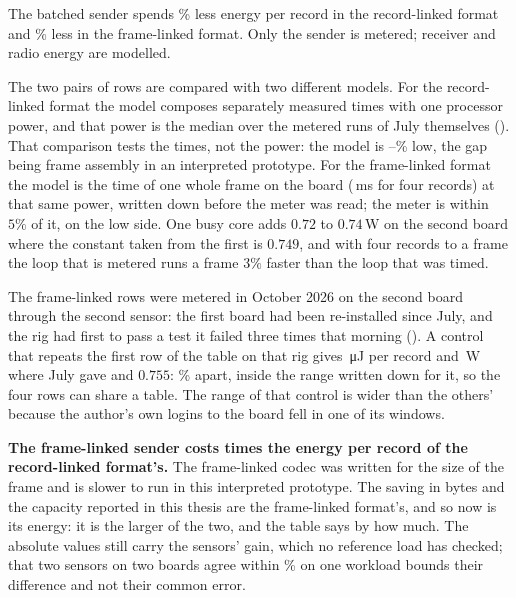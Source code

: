 The batched sender spends \enSavePct\% less energy per record in the record-linked format and
\enLeanSavePct\% less in the frame-linked format. Only the sender is metered; receiver and radio energy
are modelled.

The two pairs of rows are compared with two different models. For the record-linked format the model
composes separately measured times with one processor power, and that power is the median over
the metered runs of July themselves (). That comparison tests the
times, not the power: the model is \enDesignGap--\enBaseGap\% low, the gap being frame assembly
in an interpreted prototype. For the frame-linked format the model is the time of one whole frame on
the board (\leanSendMs\,ms for four records) at that same power, written down before the meter
was read; the meter is within $5\%$ of it, on the low side. One busy core adds $0.72$ to
$0.74$\,W on the second board where the constant taken from the first is $0.749$, and with four
records to a frame the loop that is metered runs a frame $3\%$ faster than the loop that was
timed.

\begin{remark}
The frame-linked rows were metered in October 2026 on the second board through the second sensor: the
first board had been re-installed since July, and the rig had first to pass a test it failed
three times that morning (). A control that repeats the first row of
the table on that rig gives \enCtlMeas\,\si{\micro\joule} \enCtlRange{} per record and
\enCtlPower\,W where July gave \enBaseMeas{} and $0.755$: \enCtlVsJuly\% apart, inside the
range written down for it, so the four rows can share a table. The range of that control is wider than the others' because the author's own
logins to the board fell in one of its windows.

\textbf{The frame-linked sender costs \enLeanOverFirst{} times the energy per record of the record-linked
format's.} The frame-linked codec was written for the size of the frame and is slower to run in this
interpreted prototype. The saving in bytes and the capacity reported in this thesis are the
frame-linked format's, and so now is its energy: it is the larger of the two, and the table says by
how much. The absolute values still carry the sensors' gain, which no reference load has
checked; that two sensors on two boards agree within \enCtlVsJuly\% on one workload bounds
their difference and not their common error.
\end{remark}

